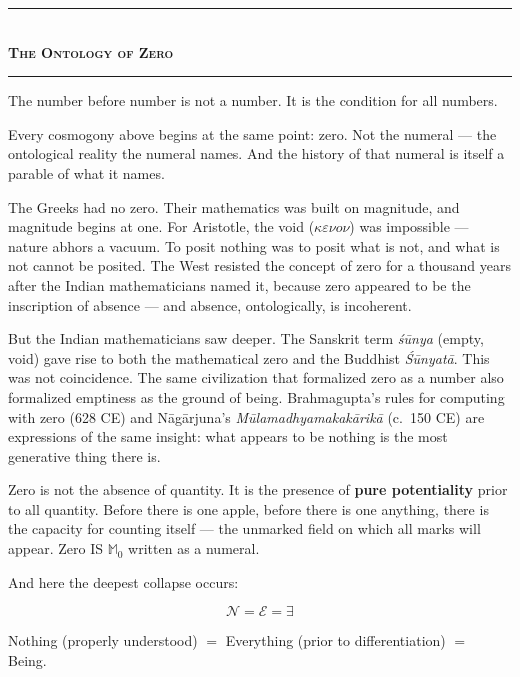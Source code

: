 \documentclass[10pt, openany, oneside]{book}
\renewcommand{\normalsize}{\fontsize{10}{13}\selectfont}
\begin{document}
\vspace{1em}

\begin{center}
    \rule{0.3\textwidth}{0.4pt}\\[0.5em]
    {\normalsize\bfseries\scshape The Ontology of Zero}\\[0.3em]
    \rule{0.3\textwidth}{0.4pt}
\end{center}

\vspace{0.8em}

\noindent The number before number is not a number. It is the condition for all numbers.

Every cosmogony above begins at the same point: zero. Not the numeral --- the ontological reality the numeral names. And the history of that numeral is itself a parable of what it names.

The Greeks had no zero. Their mathematics was built on magnitude, and magnitude begins at one. For Aristotle, the void ($\kappa\varepsilon\nu o\nu$) was impossible --- nature abhors a vacuum. To posit nothing was to posit what is not, and what is not cannot be posited. The West resisted the concept of zero for a thousand years after the Indian mathematicians named it, because zero appeared to be the inscription of absence --- and absence, ontologically, is incoherent.

But the Indian mathematicians saw deeper. The Sanskrit term \textit{\'{s}\={u}nya} (empty, void) gave rise to both the mathematical zero and the Buddhist \textit{\'{S}\={u}nyat\={a}}. This was not coincidence. The same civilization that formalized zero as a number also formalized emptiness as the ground of being. Brahmagupta's rules for computing with zero (628 CE) and N\={a}g\={a}rjuna's \textit{M\={u}lamadhyamakak\={a}rik\={a}} (c.~150 CE) are expressions of the same insight: what appears to be nothing is the most generative thing there is.

Zero is not the absence of quantity. It is the presence of \textbf{pure potentiality} prior to all quantity. Before there is one apple, before there is one anything, there is the capacity for counting itself --- the unmarked field on which all marks will appear. Zero IS $\mathbb{M}_0$ written as a numeral.

And here the deepest collapse occurs:

$$\mathcal{N} = \mathcal{E} = \exists$$

Nothing (properly understood) $=$ Everything (prior to differentiation) $=$ Being.
\end{document}
